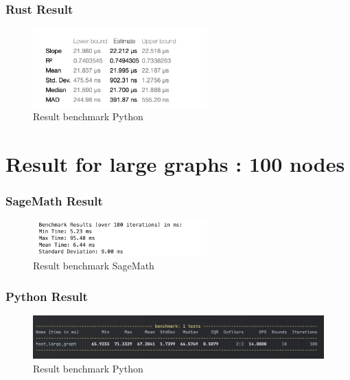 \subsubsection*{Rust Result}
\begin{figure}[!h]
    \centering
    \includegraphics[width=0.60\textwidth]{images/benchmark/digraph/benchmark_digraph_rust}
    \caption{Result benchmark Python}
    \label{fig:benchmark-digraph-rust}
\end{figure}


\section{Result for large graphs : 100 nodes}\label{sec:result-for-large-graphs}

\subsubsection*{SageMath Result}
\begin{figure}[!h]
    \centering
    \includegraphics[width=0.60\textwidth]{images/benchmark/large_graph/benchmark_large_graph_sagemath}
    \caption{Result benchmark SageMath}
    \label{fig:benchmark-large-graph-sagemath}
\end{figure}

\subsubsection*{Python Result}
\begin{figure}[!h]
    \centering
    \includegraphics[width=1\textwidth]{images/benchmark/large_graph/benchmark_large_graph_python}
    \caption{Result benchmark Python}
    \label{fig:benchmark-large-graph-python}
\end{figure}


